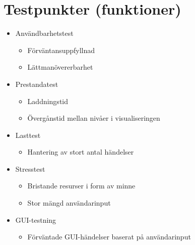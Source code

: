\section{Testpunkter (funktioner)}
\begin{itemize}
\item Användbarhetstest
\begin{itemize}
\item Förväntansuppfyllnad
\item Lättmanövererbarhet
\end{itemize}

\item Prestandatest
\begin{itemize}
\item Laddningstid
\item Övergånstid mellan nivåer i visualiseringen
\end{itemize}

\item Lasttest
\begin{itemize}
\item Hantering av stort antal händelser
\end{itemize}

\item Stresstest
\begin{itemize}
\item Bristande resurser i form av minne
\item Stor mängd användarinput 
\end{itemize}

\item GUI-testning
\begin{itemize}
\item Förväntade GUI-händelser baserat på användarinput
\end{itemize}
\end{itemize}